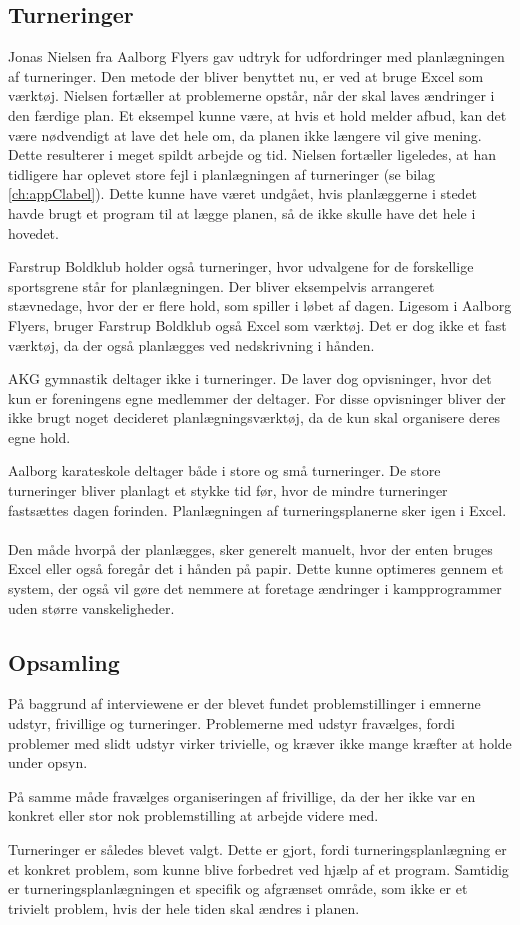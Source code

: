 \subsection*{Turneringer}
Jonas Nielsen fra Aalborg Flyers gav udtryk for udfordringer med planlægningen af turneringer. Den metode der bliver benyttet nu, er ved at bruge Excel som værktøj. Nielsen fortæller at problemerne opstår, når der skal laves ændringer i den færdige plan. Et eksempel kunne være, at hvis et hold melder afbud, kan det være nødvendigt at lave det hele om, da planen ikke længere vil give mening. Dette resulterer i meget spildt arbejde og tid. Nielsen fortæller ligeledes, at han tidligere har oplevet store fejl i planlægningen af turneringer (se bilag \ref{ch:appClabel}). Dette kunne have været undgået, hvis planlæggerne i stedet havde brugt et program til at lægge planen, så de ikke skulle have det hele i hovedet.
\par
Farstrup Boldklub holder også turneringer, hvor udvalgene for de forskellige sportsgrene står for planlægningen. Der bliver eksempelvis arrangeret stævnedage, hvor der er flere hold, som spiller i løbet af dagen. Ligesom i Aalborg Flyers, bruger Farstrup Boldklub også Excel som værktøj. Det er dog ikke et fast værktøj, da der også planlægges ved nedskrivning i hånden.
\par
AKG gymnastik deltager ikke i turneringer. De laver dog opvisninger, hvor det kun er foreningens egne medlemmer der deltager. For disse opvisninger bliver der ikke brugt noget decideret planlægningsværktøj, da de kun skal organisere deres egne hold. %
\par
Aalborg karateskole deltager både i store og små turneringer. De store turneringer bliver planlagt et stykke tid før, hvor de mindre turneringer fastsættes dagen forinden. Planlægningen af turneringsplanerne sker igen i Excel. 
\\\\
Den måde hvorpå der planlægges, sker generelt manuelt, hvor der enten bruges Excel eller også foregår det i hånden på papir. Dette kunne optimeres gennem et system, der også vil gøre det nemmere at foretage ændringer i kampprogrammer uden større vanskeligheder.

\subsection*{Opsamling}
På baggrund af interviewene er der blevet fundet problemstillinger i emnerne udstyr, frivillige og turneringer. Problemerne med udstyr fravælges, fordi problemer med slidt udstyr virker trivielle, og kræver ikke mange kræfter at holde under opsyn.
\par
På samme måde fravælges organiseringen af frivillige, da der her ikke var en konkret eller stor nok problemstilling at arbejde videre med.
\par
Turneringer er således blevet valgt. Dette er gjort, fordi turneringsplanlægning er et konkret problem, som kunne blive forbedret ved hjælp af et program. Samtidig er turneringsplanlægningen et specifik og afgrænset område, som ikke er et trivielt problem, hvis der hele tiden skal ændres i planen.

